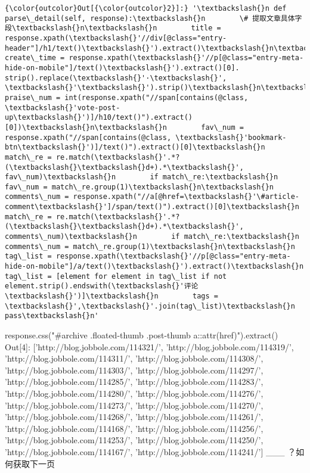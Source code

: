 \documentclass[11pt]{article}
\begin{document}
\begin{Verbatim}[commandchars=\\\{\}]
{\color{outcolor}Out[{\color{outcolor}2}]:} '\textbackslash{}n def parse\_detail(self, response):\textbackslash{}n        \# 提取文章具体字段\textbackslash{}n\textbackslash{}n        title = response.xpath(\textbackslash{}'//div[@class="entry-header"]/h1/text()\textbackslash{}').extract()\textbackslash{}n\textbackslash{}n        create\_time = response.xpath(\textbackslash{}'//p[@class="entry-meta-hide-on-mobile"]/text()\textbackslash{}').extract()[0].             strip().replace(\textbackslash{}'·\textbackslash{}', \textbackslash{}'\textbackslash{}').strip()\textbackslash{}n\textbackslash{}n        praise\_num = int(response.xpath("//span[contains(@class, \textbackslash{}'vote-post-up\textbackslash{}')]/h10/text()").extract()[0])\textbackslash{}n\textbackslash{}n        fav\_num = response.xpath("//span[contains(@class, \textbackslash{}'bookmark-btn\textbackslash{}')]/text()").extract()[0]\textbackslash{}n        match\_re = re.match(\textbackslash{}'.*?(\textbackslash{}\textbackslash{}d+).*\textbackslash{}', fav\_num)\textbackslash{}n        if match\_re:\textbackslash{}n            fav\_num = match\_re.group(1)\textbackslash{}n\textbackslash{}n        comments\_num = response.xpath("//a[@href=\textbackslash{}'\#article-comment\textbackslash{}']/span/text()").extract()[0]\textbackslash{}n        match\_re = re.match(\textbackslash{}'.*?(\textbackslash{}\textbackslash{}d+).*\textbackslash{}', comments\_num)\textbackslash{}n        if match\_re:\textbackslash{}n            comments\_num = match\_re.group(1)\textbackslash{}n\textbackslash{}n        tag\_list = response.xpath(\textbackslash{}'//p[@class="entry-meta-hide-on-mobile"]/a/text()\textbackslash{}').extract()\textbackslash{}n        tag\_list = [element for element in tag\_list if not element.strip().endswith(\textbackslash{}'评论\textbackslash{}')]\textbackslash{}n        tags = \textbackslash{}',\textbackslash{}'.join(tag\_list)\textbackslash{}n        pass\textbackslash{}n'
\end{Verbatim}
            
    response.css("\#archive .floated-thumb .post-thumb
a::attr(href)").extract()\\
Out{[}4{]}: {[}'http://blog.jobbole.com/114321/',
'http://blog.jobbole.com/114319/', 'http://blog.jobbole.com/114311/',
'http://blog.jobbole.com/114308/', 'http://blog.jobbole.com/114303/',
'http://blog.jobbole.com/114297/', 'http://blog.jobbole.com/114285/',
'http://blog.jobbole.com/114283/', 'http://blog.jobbole.com/114280/',
'http://blog.jobbole.com/114276/', 'http://blog.jobbole.com/114273/',
'http://blog.jobbole.com/114270/', 'http://blog.jobbole.com/114268/',
'http://blog.jobbole.com/114261/', 'http://blog.jobbole.com/114168/',
'http://blog.jobbole.com/114256/', 'http://blog.jobbole.com/114253/',
'http://blog.jobbole.com/114250/', 'http://blog.jobbole.com/114167/',
'http://blog.jobbole.com/114241/'{]} \_\_\_ ？如何获取下一页
\end{document}
